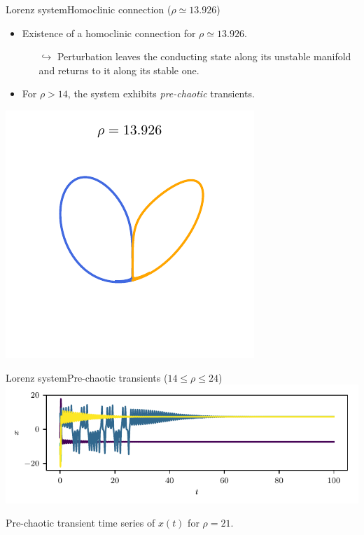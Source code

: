 \documentclass[usenames,dvipsnames,svgnames,10pt,aspectratio=169]{beamer}
\begin{document}
\begin{frame}[t, c]{Lorenz system}{Homoclinic connection ($\rho \simeq 13.926$)}
	\begin{minipage}{.48\textwidth}
		\begin{itemize}
			\item Existence of a homoclinic connection for $\rho \simeq 13.926$.
			\begin{itemize}
				\item[$\hookrightarrow$] Perturbation leaves the conducting state along its unstable manifold and returns to it along its stable one.
			\end{itemize}

			\bigskip

			\item For $\rho > 14$, the system exhibits \emph{pre-chaotic} transients.
		\end{itemize}
	\end{minipage}%
	\hfill
	\begin{minipage}{.48\textwidth}
		\centering
		\includegraphics[width=.8\textwidth]{homoclinic_connection}
	\end{minipage}

	\vspace{1cm}
\end{frame}

\begin{frame}[t, c]{Lorenz system}{Pre-chaotic transients ($14 \leq \rho \leq 24$)}
	\centering
	\includegraphics[width=.75\textwidth]{chaotic_transients_time_series}

	Pre-chaotic transient time series of $x(t)$ for $\rho=21$.
\end{frame}
\end{document}
